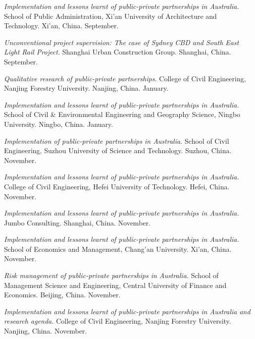 \documentclass[11pt,a4paper]{report} %
\begin{document}
\begin{tablist}
        \item[2019] \tab{}\textit{Implementation and lessons learnt of public-private partnerships in Australia.} School of Public Administration, Xi'an University of Architecture and Technology. Xi'an, China. September.
        
        \item[2019] \tab{}\textit{Unconventional project supervision: The case of Sydney CBD and South East Light Rail Project.} Shanghai Urban Construction Group. Shanghai, China. September.
        
        \item[2019] \tab{}\textit{Qualitative research of public-private partnerships.} College of Civil Engineering, Nanjing Forestry University. Nanjing, China. January.
        
        \item[2019] \tab{}\textit{Implementation and lessons learnt of public-private partnerships in Australia.} School of Civil \& Environmental Engineering and Geography Science, Ningbo University. Ningbo, China. January.
        
        \item[2018] \tab{}\textit{Implementation of public-private partnerships in Australia.} School of Civil Engineering, Suzhou University of Science and Technology. Suzhou, China. November.
        
        \item[2018] \tab{}\textit{Implementation and lessons learnt of public-private partnerships in Australia.} College of Civil Engineering, Hefei University of Technology. Hefei, China. November.
        
        \item[2018] \tab{}\textit{Implementation and lessons learnt of public-private partnerships in Australia.} Jumbo Consulting. Shanghai, China. November.
        
        \item[2018] \tab{}\textit{Implementation and lessons learnt of public-private partnerships in Australia.} School of Economics and Management, Chang'an University. Xi'an, China. November.
        
        \item[2018] \tab{}\textit{Risk management of public-private partnerships in Australia.} School of Management Science and Engineering, Central University of Finance and Economics. Beijing, China. November.
        
        \item[2018] \tab{}\textit{Implementation and lessons learnt of public-private partnerships in Australia and research agenda.} College of Civil Engineering, Nanjing Forestry University. Nanjing, China. November.
        

\end{tablist}
\end{document}
